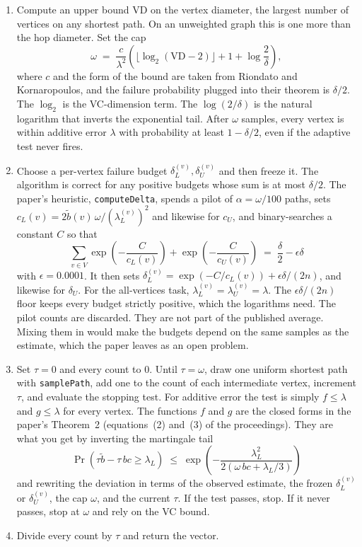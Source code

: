 \documentclass[11pt]{article}
\begin{document}
\begin{enumerate}
\item Compute an upper bound $\mathrm{VD}$ on the vertex diameter, the largest number of vertices on any shortest path. On an unweighted graph this is one more than the hop diameter. Set the cap
\[
\omega \;=\; \frac{c}{\lambda^2}\left(\lfloor \log_2(\mathrm{VD}-2)\rfloor + 1 + \log\frac{2}{\delta}\right),
\]
where $c$ and the form of the bound are taken from Riondato and Kornaropoulos, and the failure probability plugged into their theorem is $\delta/2$. The $\log_2$ is the VC-dimension term. The $\log(2/\delta)$ is the natural logarithm that inverts the exponential tail. After $\omega$ samples, every vertex is within additive error $\lambda$ with probability at least $1-\delta/2$, even if the adaptive test never fires.
\item Choose a per-vertex failure budget $\delta_L^{(v)}, \delta_U^{(v)}$ and then freeze it. The algorithm is correct for any positive budgets whose sum is at most $\delta/2$. The paper's heuristic, \texttt{computeDelta}, spends a pilot of $\alpha=\omega/100$ paths, sets $c_L(v)=2\tilde b(v)\,\omega/(\lambda_L^{(v)})^2$ and likewise for $c_U$, and binary-searches a constant $C$ so that
\[
\sum_{v\in V}\exp\left(-\frac{C}{c_L(v)}\right)+\exp\left(-\frac{C}{c_U(v)}\right)
\;=\; \frac{\delta}{2}-\epsilon\delta
\]
with $\epsilon=0.0001$. It then sets $\delta_L^{(v)}=\exp(-C/c_L(v))+\epsilon\delta/(2n)$, and likewise for $\delta_U$. For the all-vertices task, $\lambda_L^{(v)}=\lambda_U^{(v)}=\lambda$. The $\epsilon\delta/(2n)$ floor keeps every budget strictly positive, which the logarithms need. The pilot counts are discarded. They are not part of the published average. Mixing them in would make the budgets depend on the same samples as the estimate, which the paper leaves as an open problem.
\item Set $\tau=0$ and every count to 0. Until $\tau=\omega$, draw one uniform shortest path with \texttt{samplePath}, add one to the count of each intermediate vertex, increment $\tau$, and evaluate the stopping test. For additive error the test is simply $f\le\lambda$ and $g\le\lambda$ for every vertex. The functions $f$ and $g$ are the closed forms in the paper's Theorem~2 (equations~(2) and~(3) of the proceedings). They are what you get by inverting the martingale tail
\[
\Pr\!\left(\tau\tilde b-\tau\,bc \ge \lambda_L\right)
\;\le\;
\exp\!\left(-\frac{\lambda_L^2}{2(\omega\,bc+\lambda_L/3)}\right)
\]
and rewriting the deviation in terms of the observed estimate, the frozen $\delta_L^{(v)}$ or $\delta_U^{(v)}$, the cap $\omega$, and the current $\tau$. If the test passes, stop. If it never passes, stop at $\omega$ and rely on the VC bound.
\item Divide every count by $\tau$ and return the vector.
\end{enumerate}
\end{document}

